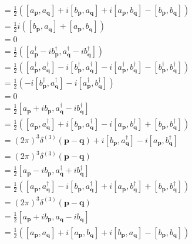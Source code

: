 \documentclass[10pt,a4paper]{book}
\theoremstyle{definition}
\begin{document}
\begin{enumerate}[(a)]
\begin{align}
&=\frac{1}{2}([a_\mathbf{p},a_\mathbf{q}]+i[b_\mathbf{p},a_\mathbf{q}]+i[a_\mathbf{p},b_\mathbf{q}]-[b_\mathbf{p},b_\mathbf{q}])\\
&=\frac{1}{2}i([b_\mathbf{p},a_\mathbf{q}]+[a_\mathbf{p},b_\mathbf{q}])\\
&=0
\end{align}
\begin{align}
[\alpha^\dagger_\mathbf{p},\alpha^\dagger_\mathbf{q}]
&=\frac{1}{2}([a^\dagger_\mathbf{p}-ib^\dagger_\mathbf{p},a^\dagger_\mathbf{q}-ib^\dagger_\mathbf{q}])\\
&=\frac{1}{2}([a^\dagger_\mathbf{p},a^\dagger_\mathbf{q}]-i[b^\dagger_\mathbf{p},a^\dagger_\mathbf{q}]-i[a^\dagger_\mathbf{p},b^\dagger_\mathbf{q}]-[b^\dagger_\mathbf{p},b^\dagger_\mathbf{q}])\\
&=\frac{1}{2}(-i[b^\dagger_\mathbf{p},a^\dagger_\mathbf{q}]-i[a^\dagger_\mathbf{p},b^\dagger_\mathbf{q}])\\
&=0
\end{align}
\begin{align}
[\alpha_\mathbf{p},\alpha^\dagger_\mathbf{q}]
&=\frac{1}{2}[a_\mathbf{p}+ib_\mathbf{p},a^\dagger_\mathbf{q}-ib^\dagger_\mathbf{q}]\\
&=\frac{1}{2}([a_\mathbf{p},a^\dagger_\mathbf{q}]+i[b_\mathbf{p},a^\dagger_\mathbf{q}]-i[a_\mathbf{p},b^\dagger_\mathbf{q}]+[b_\mathbf{p},b^\dagger_\mathbf{q}])\\
&=(2\pi)^3\delta^{(3)}(\mathbf{p}-\mathbf{q})+i[b_\mathbf{p},a^\dagger_\mathbf{q}]-i[a_\mathbf{p},b^\dagger_\mathbf{q}]\\
&=(2\pi)^3\delta^{(3)}(\mathbf{p}-\mathbf{q})
\end{align}
\begin{align}
[\beta_\mathbf{p},\beta^\dagger_\mathbf{q}]
&=\frac{1}{2}[a_\mathbf{p}-ib_\mathbf{p},a^\dagger_\mathbf{q}+ib^\dagger_\mathbf{q}]\\
&=\frac{1}{2}([a_\mathbf{p},a^\dagger_\mathbf{q}]-i[b_\mathbf{p},a^\dagger_\mathbf{q}]+i[a_\mathbf{p},b^\dagger_\mathbf{q}]+[b_\mathbf{p},b^\dagger_\mathbf{q}])\\
&=(2\pi)^3\delta^{(3)}(\mathbf{p}-\mathbf{q})
\end{align}
\begin{align}
[\alpha_\mathbf{p},\beta_\mathbf{q}]
&=\frac{1}{2}[a_\mathbf{p}+ib_\mathbf{p},a_\mathbf{q}-ib_\mathbf{q}]\\
&=\frac{1}{2}([a_\mathbf{p},a_\mathbf{q}]+i[a_\mathbf{p},b_\mathbf{q}]+i[b_\mathbf{p},a_\mathbf{q}]-[b_\mathbf{p},b_\mathbf{q}])\\

\end{align}
\end{enumerate}
\end{document}
